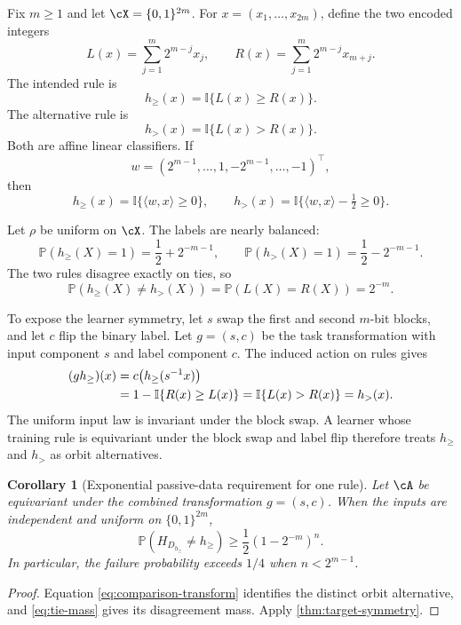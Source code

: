 \documentclass[11pt,twoside]{article}
\newcommand{\I}{\mathbb I}
\renewcommand{\P}{\mathbb P}
\newtheorem{corollary}[theorem]{Corollary}
\theoremstyle{definition}
\theoremstyle{remark}
\begin{document}
Fix \(m\ge1\) and let \(\cX=\{0,1\}^{2m}\). For
\(x=(x_1,\ldots,x_{2m})\), define the two encoded integers
\begin{equation}
 L(x)=\sum_{j=1}^m2^{m-j}x_j,
 \qquad
 R(x)=\sum_{j=1}^m2^{m-j}x_{m+j}.
 \label{eq:encoded-integers}
\end{equation}
The intended rule is
\begin{equation}
 h_{\ge}(x)=\I\{L(x)\ge R(x)\}.
 \label{eq:ge-rule}
\end{equation}
The alternative rule is
\begin{equation}
 h_{>}(x)=\I\{L(x)>R(x)\}.
 \label{eq:gt-rule}
\end{equation}
Both are affine linear classifiers. If
\[
 w=(2^{m-1},\ldots,1,-2^{m-1},\ldots,-1)^\top,
\]
then
\begin{equation}
 h_{\ge}(x)=\I\{\langle w,x\rangle\ge0\},
 \qquad
 h_{>}(x)=\I\{\langle w,x\rangle-\tfrac12\ge0\}.
 \label{eq:linear-comparisons}
\end{equation}

Let \(\rho\) be uniform on \(\cX\). The labels are nearly balanced:
\begin{equation}
 \P(h_{\ge}(X)=1)=\frac12+2^{-m-1},
 \qquad
 \P(h_{>}(X)=1)=\frac12-2^{-m-1}.
 \label{eq:balanced-labels}
\end{equation}
The two rules disagree exactly on ties, so
\begin{equation}
 \P(h_{\ge}(X)\ne h_{>}(X))
 =\P(L(X)=R(X))=2^{-m}.
 \label{eq:tie-mass}
\end{equation}

To expose the learner symmetry, let \(s\) swap the first and second
\(m\)-bit blocks, and let \(c\) flip the binary label. Let \(g=(s,c)\) be the
task transformation with input component \(s\) and label component \(c\).
The induced action on rules gives
\begin{align}
 (gh_{\ge})(x)
 &=c\bigl(h_{\ge}(s^{-1}x)\bigr)\notag\\
 &=1-\I\{R(x)\ge L(x)\}
 =\I\{L(x)>R(x)\}
 =h_{>}(x).
 \label{eq:comparison-transform}
\end{align}
The uniform input law is invariant under the block swap. A learner whose
training rule is equivariant under the block swap and label flip therefore
treats \(h_{\ge}\) and \(h_{>}\) as orbit alternatives.

\begin{corollary}[Exponential passive-data requirement for one rule]
\label{cor:comparison-lower}
Let \(\cA\) be equivariant under the combined transformation \(g=(s,c)\). When
the inputs are independent and uniform on \(\{0,1\}^{2m}\),
\begin{equation}
 \P(H_{D_{h_{\ge}}}\ne h_{\ge})
 \ge\frac12(1-2^{-m})^n.
 \label{eq:comparison-failure}
\end{equation}
In particular, the failure probability exceeds \(1/4\) when
\(n<2^{m-1}\).
\end{corollary}
\begin{proof}
Equation \eqref{eq:comparison-transform} identifies the distinct orbit
alternative, and \cref{eq:tie-mass} gives its disagreement mass. Apply
\cref{thm:target-symmetry}.
\end{proof}
\end{document}
